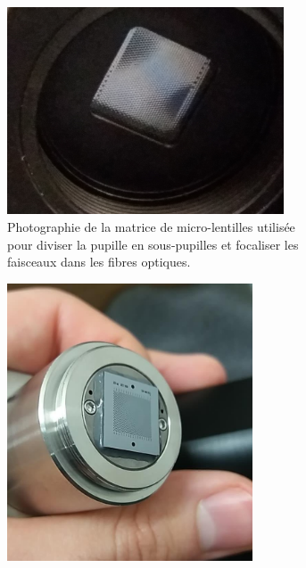\begin{figure}[ht!]
    \centering
    \begin{subfigure}{0.5\textwidth}
        \centering
        \includegraphics[width=0.9\textwidth]{Figure_Chap2/MicroLensArray.jpg}
        \caption{Photographie de la matrice de micro-lentilles utilisée pour diviser la pupille en sous-pupilles et focaliser les faisceaux dans les fibres optiques.}
        \label{fig:InjectionCompA}
    \end{subfigure}
    \begin{subfigure}[t]{0.5\textwidth}
        \centering
        \includegraphics[width=0.8\textwidth]{Figure_Chap2/FiberBundle_Meudon03.jpg}

\end{subfigure}
\end{figure}
